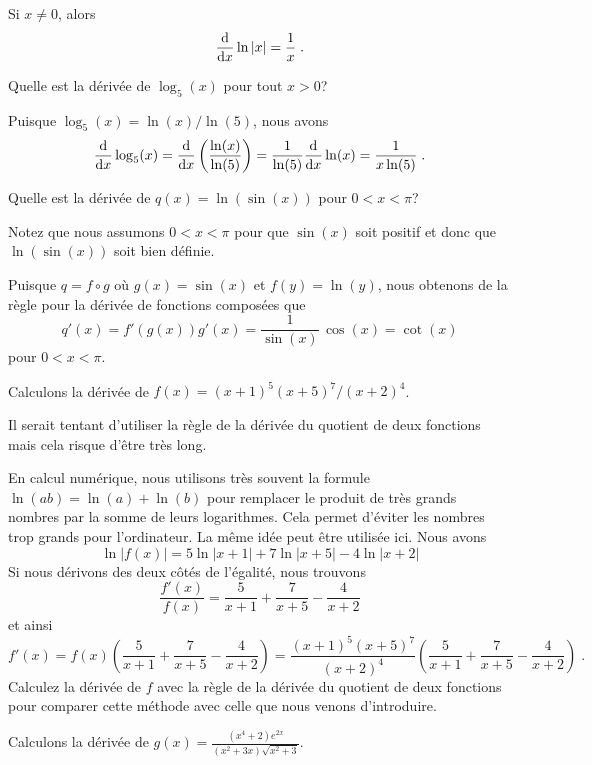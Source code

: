 {\begin{focus}{\prp}
Si $x\neq 0$, alors
\[
\dfdx{\ln|x|}{x} = \frac{1}{x} \; .
\]
\end{focus}

\begin{egg}
Quelle est la dérivée de $\log_5(x)$ pour tout $x>0$?

Puisque $\log_5(x) = \ln(x)/\ln(5)$, nous avons
\[
\dfdx{\log_5(x)}{x} = \dfdx{\left(\frac{\ln(x)}{\ln(5)}\right)}{x}
= \frac{1}{\ln(5)} \dfdx{\ln(x)}{x}
= \frac{1}{x\ln(5)} \; .
\]
\end{egg}

\begin{egg}
Quelle est la dérivée de $q(x) = \ln( \sin(x) )$ pour $0 < x < \pi$?

Notez que nous assumons $0<x<\pi$ pour que $\sin(x)$ soit positif et
donc que $\ln(\sin(x))$ soit bien définie.

Puisque $q = f\circ g$ où $g(x) = \sin(x)$ et $f(y) = \ln(y)$, nous
obtenons de la règle pour la dérivée de fonctions composées que
\[
q'(x) = f'(g(x)) g'(x) = \frac{1}{\sin(x)} \, \cos(x)
= \cot(x)
\]
pour $0 < x < \pi$.
\end{egg}

\begin{egg}
Calculons la dérivée de $f(x) = (x+1)^5(x+5)^7/(x+2)^4$.

Il serait tentant d'utiliser la règle de la dérivée du quotient de
deux fonctions mais cela risque d'être très long.

En calcul numérique, nous utilisons très souvent la formule
$\ln(ab) = \ln(a)+\ln(b)$ pour remplacer le produit de très
grands nombres par la somme de leurs logarithmes.  Cela permet
d'éviter les nombres trop grands pour l'ordinateur.
La même idée peut être utilisée ici.  Nous avons
\[
\ln|f(x)| = 5\ln|x+1| + 7\ln|x+5| - 4\ln|x+2|
\]
Si nous dérivons des deux côtés de l'égalité, nous trouvons
\[
\frac{f'(x)}{f(x)} = \frac{5}{x+1} + \frac{7}{x+5} - \frac{4}{x+2}
\]
et ainsi
\[
f'(x) = f(x) \left(\frac{5}{x+1} + \frac{7}{x+5} - \frac{4}{x+2} \right)
= \frac{(x+1)^5(x+5)^7}{(x+2)^4}
\left(\frac{5}{x+1} + \frac{7}{x+5} - \frac{4}{x+2} \right) \; .
\]
Calculez la dérivée de $f$ avec la règle de la dérivée du quotient de
deux fonctions pour comparer cette méthode avec celle que nous venons
d'introduire.
\end{egg}

\begin{egg}
Calculons la dérivée de
$\displaystyle g(x) = \frac{(x^4+2)e^{2x}}{(x^2+3x)\sqrt{x^2+3}}$.


\end{egg}}
